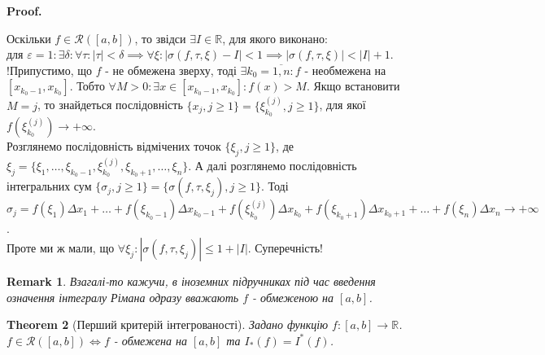 \documentclass[a4paper, 10pt]{article}
\makeatletter
\def\qed{$\blacksquare$}
\theoremstyle{theoremdd}
\newtheorem{theorem}{Theorem}[subsection]
\theoremstyle{theoremdd}
\theoremstyle{theoremdd}
\theoremstyle{theoremdd}
\theoremstyle{theoremdd}
\theoremstyle{theoremdd}
\theoremstyle{theoremdd}
\newtheorem{remark}[theorem]{Remark}
\theoremstyle{theoremdd}
\theoremstyle{theoremdd}
\renewenvironment{proof}[1][Proof.\\]{\par
\pushQED{\hfill \qed}%
\normalfont \topsep6\p@\@plus6\p@\relax
\trivlist
\item\relax
{\bfseries
#1\@addpunct{.}}\hspace\labelsep\ignorespaces
}{%
\popQED\endtrivlist\@endpefalse
}
\makeatother
\begin{document}
\begin{proof}
Оскільки $f \in \mathcal{R}([a,b])$, то звідси $\exists I \in \mathbb{R}$, для якого виконано:\\
для $\varepsilon = 1: \exists \delta: \forall \tau: |\tau| < \delta \implies \forall \xi: |\sigma(f, \tau, \xi) - I| < 1 \implies |\sigma(f, \tau, \xi)| < |I|+1$.\\
!Припустимо, що $f$ - не обмежена зверху, тоді $\exists k_0 = \overline{1,n}: f$ - необмежена на $[x_{k_0-1},x_{k_0}]$. Тобто $\forall M > 0: \exists x \in [x_{k_0-1},x_{k_0}]: f(x) > M$. Якщо встановити $M = j$, то знайдеться послідовність $\{x_j, j \geq 1\} = \{\xi_{k_0}^{(j)}, j \geq 1 \}$, для якої $f \left(\xi_{k_0}^{(j)} \right) \to +\infty$. \\
Розглянемо послідовність відмічених точок $\{\xi_j, j \geq 1\}$, де $\xi_j = \{\xi_1, \dots, \xi_{k_0-1}, \xi_{k_0}^{(j)}, \xi_{k_0+1}, \dots, \xi_n\}$. А далі розглянемо послідовність інтегральних сум $\{\sigma_j, j \geq 1\} = \{\sigma(f,\tau,\xi_j), j \geq 1 \}$. Тоді\\
$\sigma_j = f(\xi_1)\Delta x_1 + \dots + f(\xi_{k_0-1})\Delta x_{k_0-1} + f(\xi_{k_0}^{(j)}) \Delta x_{k_0} + f(\xi_{k_0+1}) \Delta x_{k_0+1} + \dots + f(\xi_n) \Delta x_n \to +\infty$.\\
Проте ми ж мали, що $\forall \xi_j: |\sigma(f,\tau, \xi_j)| \leq 1 + |I|$. Суперечність!
\end{proof}

\begin{remark}
Взагалі-то кажучи, в іноземних підручниках під час введення означення інтегралу Рімана одразу вважають $f$ - обмеженою на $[a,b]$.
\end{remark}

\begin{theorem}[Перший критерій інтегрованості]
Задано функцію $f: [a,b] \to \mathbb{R}$.\\
$f \in \mathcal{R}([a,b]) \iff f$ - обмежена на $[a,b]$ та $I_*(f) = I^*(f)$.
\end{theorem}
\end{document}
